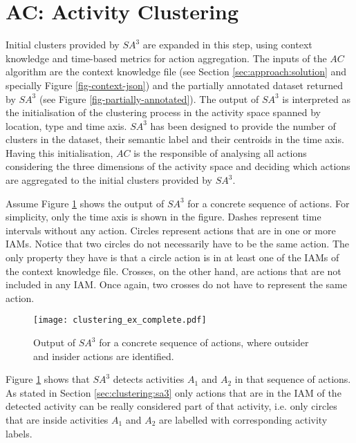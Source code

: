 \section{AC: Activity Clustering}
\label{sec:clustering:ac}

Initial clusters provided by $SA^3$ are expanded in this step, using context knowledge and time-based metrics for action aggregation. The inputs of the $AC$ algorithm are the context knowledge file (see Section \ref{sec:approach:solution} and specially Figure \ref{fig-context-json}) and the partially annotated dataset returned by $SA^3$ (see Figure \ref{fig-partially-annotated}). The output of $SA^3$ is interpreted as the initialisation of the clustering process in the activity space spanned by location, type and time axis. $SA^3$ has been designed to provide the number of clusters in the dataset, their semantic label and their centroids in the time axis. Having this initialisation, $AC$ is the responsible of analysing all actions considering the three dimensions of the activity space and deciding which actions are aggregated to the initial clusters provided by $SA^3$.

Assume Figure \ref{fig-initial-clusters} shows the output of $SA^3$ for a concrete sequence of actions. For simplicity, only the time axis is shown in the figure. Dashes represent time intervals without any action. Circles represent actions that are in one or more IAMs. Notice that two circles do not necessarily have to be the same action. The only property they have is that a circle action is in at least one of the IAMs of the context knowledge file. Crosses, on the other hand, are actions that are not included in any IAM. Once again, two crosses do not have to represent the same action. 

\begin{figure}[htbp]%
\centering
\texttt{[image: clustering\_ex\_complete.pdf]}
    \caption{Output of $SA^3$ for a concrete sequence of actions, where outsider and insider actions are identified.}
    \label{fig-initial-clusters}
\end{figure}

Figure \ref{fig-initial-clusters} shows that $SA^3$ detects activities $A_1$ and $A_2$ in that sequence of actions. As stated in Section \ref{sec:clustering:sa3} only actions that are in the IAM of the detected activity can be really considered part of that activity, i.e. only circles that are inside activities $A_1$ and $A_2$ are labelled with corresponding activity labels. 


